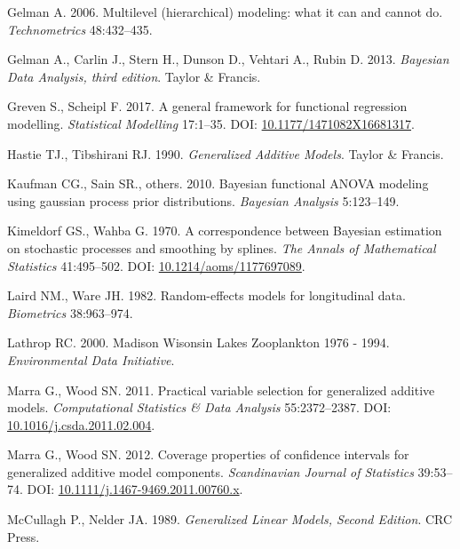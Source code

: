 \documentclass[12pt]{article}
\begin{document}
\hypertarget{ref-Gelman:2006jh}{}
Gelman A. 2006. Multilevel (hierarchical) modeling: what it can and
cannot do. \emph{Technometrics} 48:432--435.

\hypertarget{ref-gelman2013bayesian}{}
Gelman A., Carlin J., Stern H., Dunson D., Vehtari A., Rubin D. 2013.
\emph{Bayesian Data Analysis, third edition}. Taylor \& Francis.

\hypertarget{ref-greven_general_2017}{}
Greven S., Scheipl F. 2017. A general framework for functional
regression modelling. \emph{Statistical Modelling} 17:1--35. DOI:
\href{https://doi.org/10.1177/1471082X16681317}{10.1177/1471082X16681317}.

\hypertarget{ref-Hastie:1990vg}{}
Hastie TJ., Tibshirani RJ. 1990. \emph{Generalized Additive Models}.
Taylor \& Francis.

\hypertarget{ref-kaufman_bayesian_2010}{}
Kaufman CG., Sain SR., others. 2010. Bayesian functional ANOVA modeling
using gaussian process prior distributions. \emph{Bayesian Analysis}
5:123--149.

\hypertarget{ref-kimeldorf_correspondence_1970}{}
Kimeldorf GS., Wahba G. 1970. A correspondence between Bayesian
estimation on stochastic processes and smoothing by splines. \emph{The
Annals of Mathematical Statistics} 41:495--502. DOI:
\href{https://doi.org/10.1214/aoms/1177697089}{10.1214/aoms/1177697089}.

\hypertarget{ref-laird_random-effects_1982}{}
Laird NM., Ware JH. 1982. Random-effects models for longitudinal data.
\emph{Biometrics} 38:963--974.

\hypertarget{ref-lathrop_madison_2000}{}
Lathrop RC. 2000. Madison Wisonsin Lakes Zooplankton 1976 - 1994.
\emph{Environmental Data Initiative}.

\hypertarget{ref-marra_practical_2011}{}
Marra G., Wood SN. 2011. Practical variable selection for generalized
additive models. \emph{Computational Statistics \& Data Analysis}
55:2372--2387. DOI:
\href{https://doi.org/10.1016/j.csda.2011.02.004}{10.1016/j.csda.2011.02.004}.

\hypertarget{ref-marra_coverage_2012}{}
Marra G., Wood SN. 2012. Coverage properties of confidence intervals for
generalized additive model components. \emph{Scandinavian Journal of
Statistics} 39:53--74. DOI:
\href{https://doi.org/10.1111/j.1467-9469.2011.00760.x}{10.1111/j.1467-9469.2011.00760.x}.

\hypertarget{ref-McCullagh:1989ti}{}
McCullagh P., Nelder JA. 1989. \emph{Generalized Linear Models, Second
Edition}. CRC Press.
\end{document}
